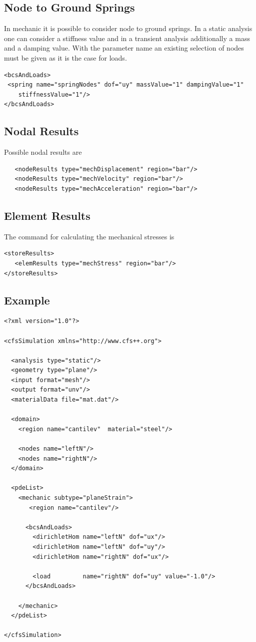 \subsection{Node to Ground Springs}
In mechanic it is possible to consider node to ground springs. In a
static analysis one can consider a stiffness value and
in a transient analysis additionally a mass and a damping value.
With the parameter name an existing selection of nodes must be given
as it is the case for loads.
\begin{verbatim}      
<bcsAndLoads>
 <spring name="springNodes" dof="uy" massValue="1" dampingValue="1" 
    stiffnessValue="1"/>
</bcsAndLoads>
\end{verbatim}

\subsection{Nodal Results}
Possible nodal results are

\begin{verbatim}
   <nodeResults type="mechDisplacement" region="bar"/>
   <nodeResults type="mechVelocity" region="bar"/>
   <nodeResults type="mechAcceleration" region="bar"/>
\end{verbatim}

\subsection{Element Results}
The command for calculating the mechanical stresses is
\begin{verbatim}      
<storeResults>
   <elemResults type="mechStress" region="bar"/>
</storeResults>
\end{verbatim}

\subsection{Example}

{\footnotesize 
\begin{verbatim}
<?xml version="1.0"?>

<cfsSimulation xmlns="http://www.cfs++.org">

  <analysis type="static"/>
  <geometry type="plane"/>
  <input format="mesh"/>
  <output format="unv"/>
  <materialData file="mat.dat"/>

  <domain>
    <region name="cantilev"  material="steel"/>

    <nodes name="leftN"/>
    <nodes name="rightN"/>
  </domain>

  <pdeList>
    <mechanic subtype="planeStrain">
       <region name="cantilev"/>

      <bcsAndLoads>
        <dirichletHom name="leftN" dof="ux"/>
        <dirichletHom name="leftN" dof="uy"/>
        <dirichletHom name="rightN" dof="ux"/>

        <load         name="rightN" dof="uy" value="-1.0"/>
      </bcsAndLoads>

    </mechanic>
  </pdeList>

</cfsSimulation>
\end{verbatim}
}


